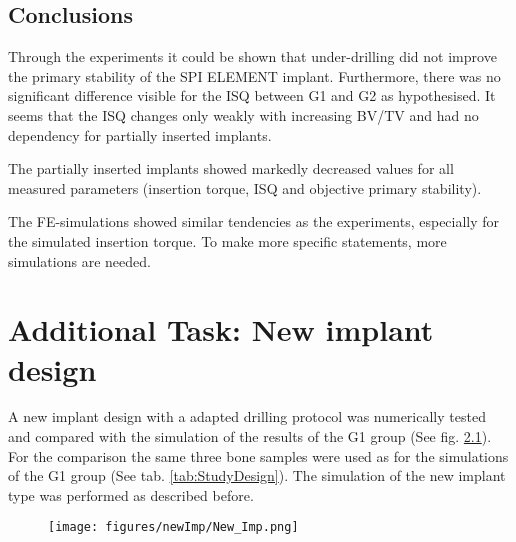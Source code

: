 \documentclass[12pt, a4paper, twoside]{report}
\begin{document}
\section{Conclusions}
%
Through the experiments it could be shown that under-drilling did not improve the primary stability of the SPI ELEMENT implant. Furthermore, there was no significant difference visible for the ISQ between G1 and G2 as hypothesised. It seems that the ISQ changes only weakly with increasing BV/TV and had no dependency for partially inserted implants.

The partially inserted implants showed markedly decreased values for all measured parameters (insertion torque, ISQ and objective primary stability).

The FE-simulations showed similar tendencies as the experiments, especially for the simulated insertion torque. To make more specific statements, more simulations are needed.



\newpage
%
\chapter{Additional Task: New implant design}
%
A new implant design with a adapted drilling protocol was numerically tested and compared with the simulation of the results of the G1 group (See fig. \ref{fig:New_Imp}). For the comparison the same three bone samples were used as for the simulations of the G1 group (See tab. \ref{tab:StudyDesign}). The simulation of the new implant type was performed as described before.
%
\begin{figure}[H]
\centering 
\label{sublable2}\texttt{[image: figures/newImp/New\_Imp.png]}
\label{fig:New_Imp}
\end{figure}
%
\end{document}
